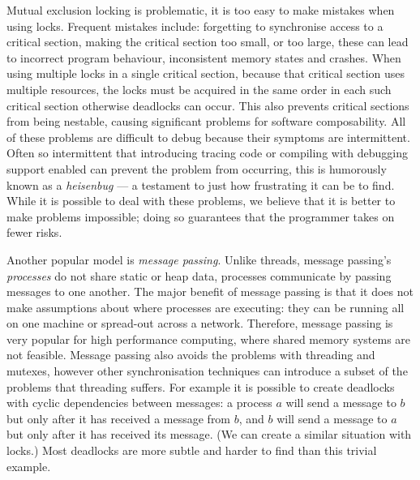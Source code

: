 Mutual exclusion locking is problematic,
it is too easy to make mistakes when using locks.
Frequent mistakes include: forgetting to synchronise access to a critical
section,
making the critical section too small, or too large,
these can lead to incorrect program behaviour, inconsistent memory states and
crashes. 
When using multiple locks in a single critical section,
because that critical section uses multiple resources,
the locks must be acquired in the same order in each such critical section
otherwise deadlocks can occur.
This also prevents critical sections from being nestable,
causing significant problems for software composability.
All of these problems are difficult to debug because their symptoms are
intermittent.
Often so intermittent that introducing tracing code or compiling with debugging
support enabled can prevent the problem from occurring,
this is humorously known as a \emph{heisenbug} ---
a testament to just how frustrating it can be to find.
While it is possible to deal with these problems,
we believe that it is better to make problems impossible;
doing so guarantees that the programmer takes on fewer risks.

Another popular model is \emph{message passing}.
Unlike threads, message passing's \emph{processes} do not share static or heap
data,
processes communicate by passing messages to one another.
The major benefit of message passing is that it does not make assumptions about where processes
are executing:
they can be running all on one machine or spread-out across a network.
Therefore, message passing is very popular for high performance computing,
where shared memory systems are not feasible.
Message passing also avoids the problems with threading and mutexes,
however other synchronisation techniques can introduce a subset of the
problems that threading suffers.
For example it is possible to create deadlocks with cyclic dependencies
between messages:
a process $a$ will send a message to $b$ but only after it has received a
message from $b$,
and $b$ will send a message to $a$ but only after it has received its message.
(We can create a similar situation with locks.)
Most deadlocks are more subtle and harder to find than this trivial example.

